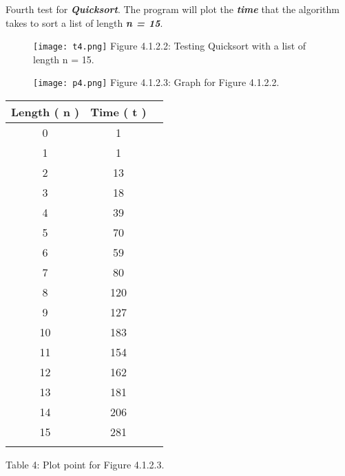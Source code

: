 \pagebreak

Fourth test for {\bfseries\itshape Quicksort}. The program will plot the {\bfseries\itshape time} that the algorithm takes to sort a list of length {\bfseries\itshape n = 15}. \hfill \break

\begin{figure}[H]
\texttt{[image: t4.png]}
\centering \linebreak \linebreak Figure 4.1.2.2: Testing Quicksort with a list of length n = 15.
\end{figure} \hfill 

\begin{multicols}{2}
\begin{figure}[H]
\texttt{[image: p4.png]}
\centering \linebreak \linebreak Figure 4.1.2.3: Graph for Figure 4.1.2.2.
\end{figure} \hfill

\begin{center}
\begin{tabular}[.5cm]{ c c c }
\toprule
Length ( n ) & Time ( t ) \\
\midrule
0 & 1 \\
\cmidrule {1-2}
1 & 1 \\
\cmidrule {1-2}
2 & 13 \\
\cmidrule {1-2}
3 & 18 \\
\cmidrule {1-2}
4 & 39 \\
\cmidrule {1-2}
5 & 70 \\
\cmidrule {1-2}
6 & 59 \\
\cmidrule {1-2}
7 & 80 \\
\cmidrule {1-2}
8 & 120 \\
\cmidrule {1-2}
9 & 127 \\
\cmidrule {1-2}
10 & 183 \\
\cmidrule {1-2}
11 & 154 \\
\cmidrule {1-2}
12 & 162 \\
\cmidrule {1-2}
13 & 181 \\
\cmidrule {1-2}
14 & 206 \\
\cmidrule {1-2}
15 & 281 \\
\bottomrule
\linebreak
\end{tabular}
\linebreak \linebreak Table 4: Plot point for Figure 4.1.2.3.
\end{center}
\end{multicols} \hfill \break

{\bfseries\itshape\color{armygreen}{Observation:}} {\itshape{}} \hfill \break

{\bfseries\itshape\color{armygreen}{Observation:}} {\itshape{}} \hfill \break

\pagebreak